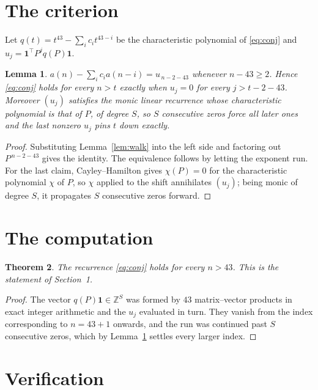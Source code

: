 \documentclass[11pt,a4paper]{article}
\theoremstyle{plain}
\newtheorem{theorem}{Theorem}
\newtheorem{lemma}[theorem]{Lemma}
\theoremstyle{definition}
\begin{document}
\section{The criterion}

Let $q(t)=t^{43}-\sum_i c_i t^{43-i}$ be the characteristic polynomial of
\eqref{eq:conj} and $u_j=\mathbf{1}^{\!\top}P^{j}q(P)\mathbf{1}$.

\begin{lemma}\label{lem:crit}
$a(n)-\sum_i c_i a(n-i)=u_{\,n-2-43}$ whenever $n-43\ge2$. Hence
\eqref{eq:conj} holds for every $n>t$ exactly when $u_j=0$ for every
$j>t-2-43$. Moreover $(u_j)$ satisfies the monic linear recurrence whose
characteristic polynomial is that of $P$, of degree $S$, so $S$ consecutive zeros force all
later ones and the last nonzero $u_j$ pins $t$ down exactly.
\end{lemma}

\begin{proof}
Substituting Lemma~\ref{lem:walk} into the left side and factoring out
$P^{\,n-2-43}$ gives the identity. The equivalence follows by letting the exponent
run. For the last claim, Cayley--Hamilton gives $\chi(P)=0$ for the characteristic
polynomial $\chi$ of $P$, so $\chi$ applied to the shift annihilates $(u_j)$; being monic of
degree $S$, it propagates $S$ consecutive zeros forward.
\end{proof}

\section{The computation}

\begin{theorem}
The recurrence \eqref{eq:conj} holds for every $n>43$. This is the statement of
Section~1.
\end{theorem}

\begin{proof}
The vector $q(P)\mathbf{1}\in\mathbb{Z}^{S}$ was formed by $43$ matrix--vector
products in exact integer arithmetic and the $u_j$ evaluated in turn. They vanish from the
index corresponding to $n=43+1$ onwards, and the run was continued past $S$ consecutive
zeros, which by Lemma~\ref{lem:crit} settles every larger index.
\end{proof}

\section{Verification}
\end{document}
